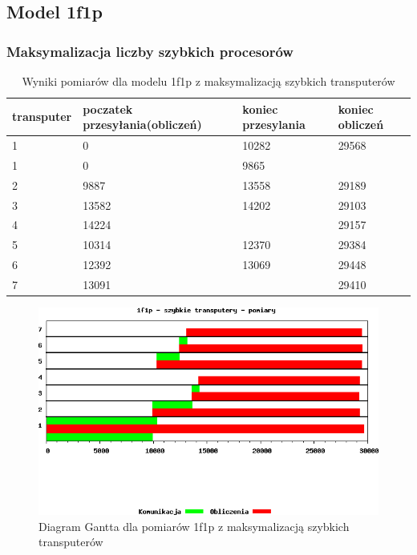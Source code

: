 \documentclass[a4paper,11pt, titlepage]{article}
\begin{document}
\subsection{Model 1f1p}
\subsubsection{Maksymalizacja liczby szybkich procesorów}
\begin{table}[hp!]
\begin{tabular}{|l|l|l|l|}\hline
transputer & poczatek przesyłania(obliczeń) & koniec przesylania & koniec obliczeń\\ \hline
1 & 0 & 10282 & 29568\\ \hline
1 & 0 & 9865  & \\ \hline
2 & 9887 & 13558 & 29189\\ \hline
3 & 13582 & 14202 & 29103\\ \hline
4 & 14224 & & 29157\\ \hline
5 & 10314 & 12370 & 29384\\ \hline
6 & 12392 & 13069 & 29448\\	\hline
7 & 13091 & & 29410\\ \hline
\end{tabular}
\caption{Wyniki pomiarów dla modelu 1f1p z maksymalizacją szybkich transputerów \label{i1f1p_p}}
\end{table}
\begin{figure}[hp!]
\includegraphics[width=1.0\textwidth]{wykresy/i1p1f_proc}
\caption{Diagram Gantta dla pomiarów 1f1p z maksymalizacją szybkich transputerów \label{i1p1f_pg}}
\end{figure}
\end{document}
